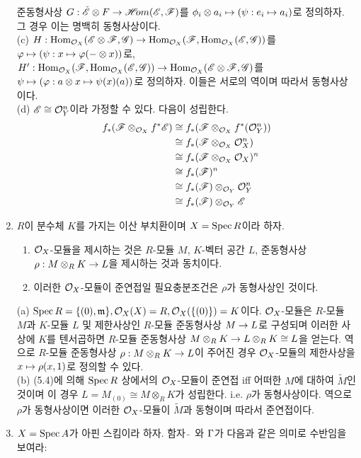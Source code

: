 \begin{enumerate}[label=\tb{5.\arabic*.},itemindent=0mm,itemsep=4mm]
	준동형사상 $G:\check{\mathscr{E}}\otimes F\rightarrow\mathscr{H}\!om(\mathscr{E},\mathscr{F})$를 $\phi_i\otimes a_i\mapsto(\psi:e_i\mapsto a_i)$로 정의하자.
	그 경우 이는 명백히 동형사상이다.\\
	(c) $H:\operatorname{Hom}_{\mathcal{O}_X}(\mathscr{E}\otimes\mathscr{F},\mathscr{G})\rightarrow\operatorname{Hom}_{\mathcal{O}_X}(\mathscr{F},\operatorname{Hom}_{\mathcal{O}_X}(\mathscr{E},\mathscr{G}))$를
	$\varphi\mapsto(\psi:x\mapsto\varphi(-\otimes x))$로,\\
	$H':\operatorname{Hom}_{\mathcal{O}_X}(\mathscr{F},\operatorname{Hom}_{\mathcal{O}_X}(\mathscr{E},\mathscr{G}))\rightarrow\operatorname{Hom}_{\mathcal{O}_X}(\mathscr{E}\otimes\mathscr{F},\mathscr{G})$를
	$\psi\mapsto(\varphi:a\otimes x\mapsto\psi(x)(a))$로 정의하자. 이들은 서로의 역이며 따라서 동형사상이다.\\
	(d) $\mathscr{E}\cong\mathcal{O}_Y^n$이라 가정할 수 있다. 다음이 성립한다.
	\begin{align*}
	f_*(\mathscr{F}\otimes_{\mathcal{O}_X}f^*\mathscr{E})&\cong f_*(\mathscr{F}\otimes_{\mathcal{O}_X}f^*(\mathcal{O}_Y^n))\\
	&\cong f_*(\mathscr{F}\otimes_{\mathcal{O}_X}\mathcal{O}_X^n)\\
	&\cong f_*(\mathscr{F}\otimes_{\mathcal{O}_X}\mathcal{O}_X)^n\\
	&\cong f_*(\mathscr{F})^n\\
	&\cong f_*(\mathscr{F})\otimes_{\mathcal{O}_Y}\mathcal{O}_Y^n\\
	&\cong f_*(\mathscr{F})\otimes_{\mathcal{O}_Y}\mathscr{E}
	\end{align*}
	\item $R$이 분수체 $K$를 가지는 이산 부치환이며 $X=\operatorname{Spec} R$이라 하자.
	\begin{enumerate}[label=(\alph*)]
	\item $\mathcal{O}_X$-모듈을 제시하는 것은 $R$-모듈 $M$, $K$-벡터 공간 $L$, 준동형사상 $\rho:M\otimes_RK\rightarrow L$을 제시하는 것과 동치이다.
	\item 이러한 $\mathcal{O}_X$-모듈이 준연접일 필요충분조건은 $\rho$가 동형사상인 것이다.
	\end{enumerate}
	\sol (a) $\operatorname{Spec} R=\{(0),\mathfrak{m}\},\mathcal{O}_X(X)=R,\mathcal{O}_X(\{(0)\})=K$이다.
	$\mathcal{O}_X$-모듈은 $R$-모듈 $M$과 $K$-모듈 $L$ 및 제한사상인 $R$-모듈 준동형사상 $M\rightarrow L$로 구성되며
	이러한 사상에 $K$를 텐서곱하면 $R$-모듈 준동형사상 $M\otimes_RK\rightarrow L\otimes_RK\cong L$을 얻는다.
	역으로 $R$-모듈 준동형사상 $\rho:M\otimes_RK\rightarrow L$이 주어진 경우 $\mathcal{O}_X$-모듈의 제한사상을 $x\mapsto\rho(x,1)$로 정의할 수 있다.\\
	(b) (5.4)에 의해 $\operatorname{Spec} R$ 상에서의 $\mathcal{O}_X$-모듈이 준연접 iff 어떠한 $M$에 대하여 $\tilde M$인 것이며
	이 경우 $L=M_{(0)}\cong M\otimes_RK$가 성립한다. i.e. $\rho$가 동형사상이다.
	역으로 $\rho$가 동형사상이면 이러한 $\mathcal{O}_X$-모듈이 $\tilde M$과 동형이며 따라서 준연접이다.
	\item $X=\operatorname{Spec} A$가 아핀 스킴이라 하자. 함자 $\tilde{\;}$ 와 $\Gamma$가 다음과 같은 의미로 수반임을 보여라:

\end{enumerate}
